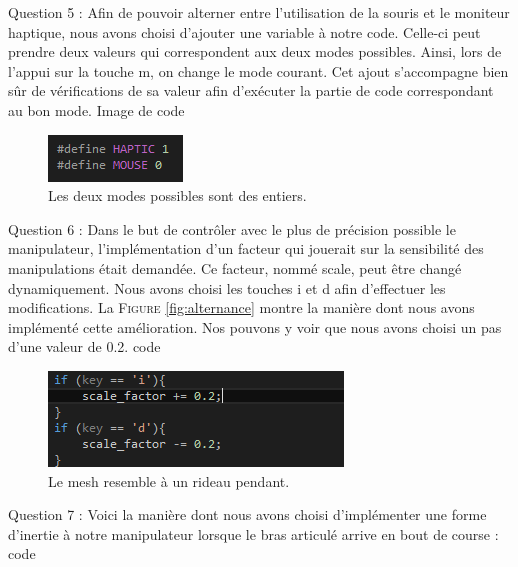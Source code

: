 \documentclass[a4paper,12pt]{article}
\begin{document}
Question 5 : Afin de pouvoir alterner entre l'utilisation de la souris et le moniteur haptique, nous avons choisi d'ajouter une variable à notre code. Celle-ci peut prendre deux valeurs qui correspondent aux deux modes possibles. Ainsi, lors de l'appui sur la touche \og{}m\fg{}, on change le mode courant. Cet ajout s'accompagne bien sûr de vérifications de sa valeur afin d'exécuter la partie de code correspondant au bon mode.
 Image de code
\begin{figure}
  \centering
  \includegraphics{images/modes.png}
  \caption{Les deux modes possibles sont des entiers.}
  \label{fig:}
\end{figure}


Question 6 : Dans le but de contrôler avec le plus de précision possible le manipulateur, l'implémentation d'un facteur qui jouerait sur la sensibilité des manipulations était demandée. Ce facteur, nommé \og{}scale\fg{}, peut être changé dynamiquement. Nous avons choisi les touches \og{}i\fg{} et \og{}d\fg{} afin d'effectuer les modifications. La \textsc{Figure} \ref{fig:alternance} montre la manière dont nous avons implémenté cette amélioration. Nos pouvons y voir que nous avons choisi un pas d'une valeur de 0.2.
code
\begin{figure}
  \centering
  \includegraphics{images/scale.png}
  \caption{Le mesh resemble à un rideau pendant.}
  \label{fig:}
\end{figure}

Question 7 : Voici la manière dont nous avons choisi d'implémenter une forme d'inertie à notre manipulateur lorsque le bras articulé arrive en bout de course :
code
\end{document}
